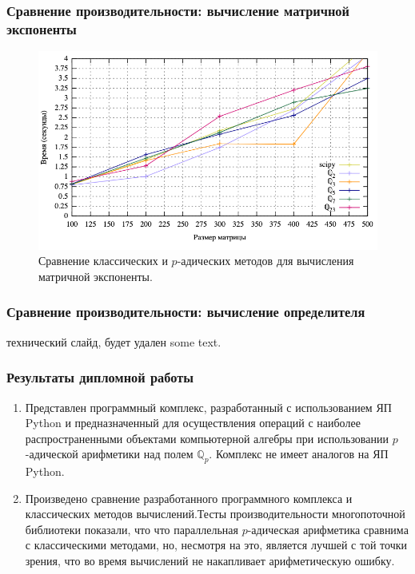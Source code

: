 \documentclass[10pt,professionalfont,utf8,presentation,compress]{beamer}
\theoremstyle{definition}
\theoremstyle{plain}
\begin{document}
\begin{frame}
\frametitle{Сравнение производительности: вычисление матричной экспоненты}
\begin{figure}[H]
\centerline{\includegraphics[width=0.95\linewidth]{../gnuplot/exp/plot.png}}
\caption{Сравнение классических и $p$-адических методов для вычисления матричной экспоненты.}
\label{img:exp:plot}
\end{figure}
\end{frame}



\begin{frame}
\frametitle{Сравнение производительности: вычисление определителя}
	технический слайд, будет удален
	some text\cite{bib:algebra:1}\cite{bib:analisys:khrennikov:1}\cite{bib:analisys:khrennikov:2}\cite{bib:analisys:vv}\cite{bib:analysis:baker}\cite{bib:analysis:vladimirov}.
\end{frame}

\begin{frame}
    \frametitle{Результаты дипломной работы}
    \begin{enumerate}
        \item Представлен программный комплекс, разработанный с использованием ЯП Python и предназначенный для осуществления операций с наиболее распространенными объектами компьютерной алгебры при использовании $p$-адической арифметики над полем $\mathbb{Q}_p$. Комплекс не имеет аналогов на ЯП Python.
        \item Произведено сравнение разработанного программного комплекса и классических методов вычислений.Тесты производительности многопоточной библиотеки показали, что что параллельная $p$-адическая арифметика сравнима с классическими методами, но, несмотря на это, является лучшей с той точки зрения, что во время вычислений не накапливает арифметическую ошибку.
    \end{enumerate}    
\end{frame}
\end{document}

